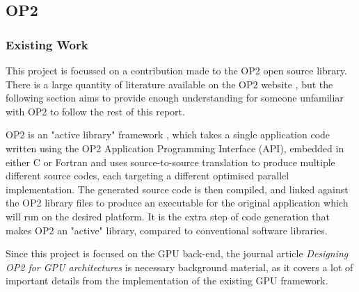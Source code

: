 \subsection{OP2}

\subsubsection{Existing Work}

This project is focussed on a contribution made to the OP2 open source library. There is a large quantity of literature available on the OP2 website \cite{op-dsl}, but the following section aims to provide enough understanding for someone unfamiliar with OP2 to follow the rest of this report.
\par
OP2 is an "active library" framework \cite{op2main}, which takes a single application code written using the OP2 Application Programming Interface (API), embedded in either C or Fortran and uses source-to-source translation to produce multiple different source codes, each targeting a different optimised parallel implementation. The generated source code is then compiled, and linked against the OP2 library files to produce an executable for the original application which will run on the desired platform. It is the extra step of code generation that makes OP2 an "active" library, compared to conventional software libraries.
\par
Since this project is focused on the GPU back-end, the journal article \textit{Designing OP2 for GPU architectures} \cite{gpudesign} is necessary background material, as it covers a lot of important details from the implementation of the existing GPU framework.

